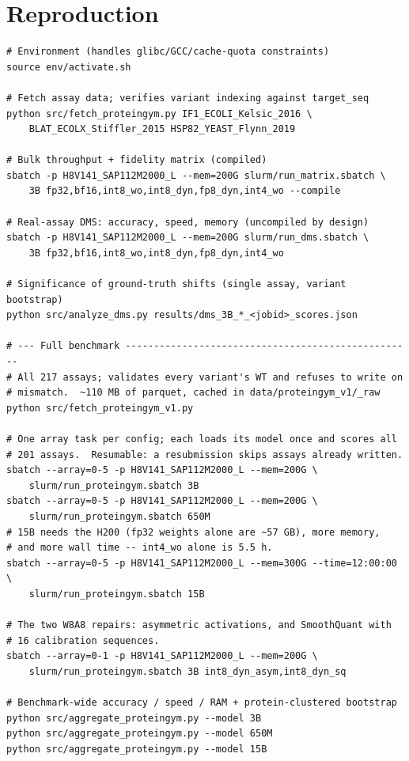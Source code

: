 \documentclass[11pt]{article}
\begin{document}
\section{Reproduction}

\begin{footnotesize}
\begin{verbatim}
# Environment (handles glibc/GCC/cache-quota constraints)
source env/activate.sh

# Fetch assay data; verifies variant indexing against target_seq
python src/fetch_proteingym.py IF1_ECOLI_Kelsic_2016 \
    BLAT_ECOLX_Stiffler_2015 HSP82_YEAST_Flynn_2019

# Bulk throughput + fidelity matrix (compiled)
sbatch -p H8V141_SAP112M2000_L --mem=200G slurm/run_matrix.sbatch \
    3B fp32,bf16,int8_wo,int8_dyn,fp8_dyn,int4_wo --compile

# Real-assay DMS: accuracy, speed, memory (uncompiled by design)
sbatch -p H8V141_SAP112M2000_L --mem=200G slurm/run_dms.sbatch \
    3B fp32,bf16,int8_wo,int8_dyn,fp8_dyn,int4_wo

# Significance of ground-truth shifts (single assay, variant bootstrap)
python src/analyze_dms.py results/dms_3B_*_<jobid>_scores.json

# --- Full benchmark ---------------------------------------------------
# All 217 assays; validates every variant's WT and refuses to write on
# mismatch.  ~110 MB of parquet, cached in data/proteingym_v1/_raw
python src/fetch_proteingym_v1.py

# One array task per config; each loads its model once and scores all
# 201 assays.  Resumable: a resubmission skips assays already written.
sbatch --array=0-5 -p H8V141_SAP112M2000_L --mem=200G \
    slurm/run_proteingym.sbatch 3B
sbatch --array=0-5 -p H8V141_SAP112M2000_L --mem=200G \
    slurm/run_proteingym.sbatch 650M
# 15B needs the H200 (fp32 weights alone are ~57 GB), more memory,
# and more wall time -- int4_wo alone is 5.5 h.
sbatch --array=0-5 -p H8V141_SAP112M2000_L --mem=300G --time=12:00:00 \
    slurm/run_proteingym.sbatch 15B

# The two W8A8 repairs: asymmetric activations, and SmoothQuant with
# 16 calibration sequences.
sbatch --array=0-1 -p H8V141_SAP112M2000_L --mem=200G \
    slurm/run_proteingym.sbatch 3B int8_dyn_asym,int8_dyn_sq

# Benchmark-wide accuracy / speed / RAM + protein-clustered bootstrap
python src/aggregate_proteingym.py --model 3B
python src/aggregate_proteingym.py --model 650M
python src/aggregate_proteingym.py --model 15B


\end{verbatim}
\end{footnotesize}
\end{document}
